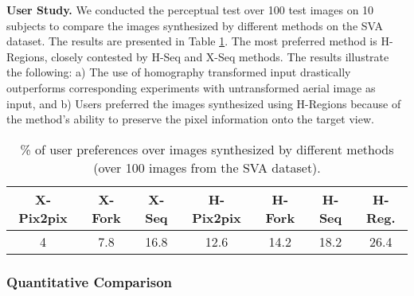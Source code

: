 \documentclass[times,twocolumn,final,authoryear]{elsarticle_modified}
\begin{document}
\noindent \textbf{User Study.}
We conducted the perceptual test over 100 test images on 10 subjects to compare the images synthesized by different methods on the SVA dataset. The results are presented in Table \ref{tab:user_study}. The most preferred method is H-Regions, closely contested by H-Seq and X-Seq methods. The results illustrate the following: a) The use of homography transformed input drastically outperforms corresponding experiments with untransformed aerial image as input, and b) Users preferred the images synthesized using H-Regions because of the method's ability to preserve the pixel information onto the target view. 



\begin{table}[t]
 \small
  \centering
  \renewcommand{\arraystretch}{.9}
  \renewcommand{\tabcolsep}{1mm}  
  
  \caption{\small \% of user preferences over images synthesized by different methods (over 100 images from the SVA dataset).}
  \vspace{-10pt}
  \label{tab:user_study}
    \begin{tabular}{ccc|ccc|c}
        \toprule
       \small X-Pix2pix & {X-Fork} & {X-Seq} & {H-Pix2pix} & {H-Fork}& {H-Seq}& {H-Reg.}\\
        \midrule
4 & 7.8 & 16.8 & 12.6 & 14.2 & 18.2 & 26.4 \\
        \bottomrule
    \end{tabular}
      \vspace{-15pt}
\end{table}
 
 

\vspace{-5pt}

\subsubsection{Quantitative Comparison}
\end{document}
